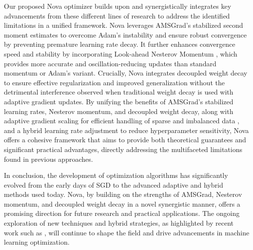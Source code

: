 \documentclass{article}
\begin{document}
Our proposed Nova optimizer builds upon and synergistically integrates key advancements from these different lines of research to address the identified limitations in a unified framework. Nova leverages AMSGrad's stabilized second moment estimates \cite{Reddi2018} to overcome Adam's instability and ensure robust convergence by preventing premature learning rate decay. It further enhances convergence speed and stability by incorporating Look-ahead Nesterov Momentum \cite{nesterov1983method}, which provides more accurate and oscillation-reducing updates than standard momentum or Adam's variant. Crucially, Nova integrates decoupled weight decay \cite{Loshchilov2017} to ensure effective regularization and improved generalization without the detrimental interference observed when traditional weight decay is used with adaptive gradient updates. By unifying the benefits of AMSGrad's stabilized learning rates, Nesterov momentum, and decoupled weight decay, along with adaptive gradient scaling for efficient handling of sparse and imbalanced data \cite{Johnson2020}, and a hybrid learning rate adjustment to reduce hyperparameter sensitivity, Nova offers a cohesive framework that aims to provide both theoretical guarantees and significant practical advantages, directly addressing the multifaceted limitations found in previous approaches.

In conclusion, the development of optimization algorithms has significantly evolved from the early days of SGD to the advanced adaptive and hybrid methods used today. Nova, by building on the strengths of AMSGrad, Nesterov momentum, and decoupled weight decay in a novel synergistic manner, offers a promising direction for future research and practical applications. The ongoing exploration of new techniques and hybrid strategies, as highlighted by recent work such as \cite{N1, N2, N3}, will continue to shape the field and drive advancements in machine learning optimization.
\end{document}
